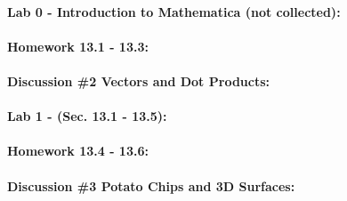 \documentclass[9pt]{amsart}
\begin{document}
        \paragraph{Lab 0 - Introduction to Mathematica (not collected):}\leavevmode\par\medskip
            
            \leavevmode\par\medskip
            
        \paragraph{Homework 13.1 - 13.3:}\leavevmode\par\medskip
            
            \leavevmode\par\medskip
            
        \paragraph{Discussion \#2 Vectors and Dot Products:}\leavevmode\par\medskip
            
            \leavevmode\par\medskip
        \newpage    
        \paragraph{Lab 1 - (Sec. 13.1 - 13.5):}\leavevmode\par\medskip
            
            \leavevmode\par\medskip
            
        \paragraph{Homework 13.4 - 13.6:}\leavevmode\par\medskip
            
            \leavevmode\par\medskip
            
        \paragraph{Discussion \#3 Potato Chips and 3D Surfaces:}\leavevmode\par\medskip
            
            \leavevmode\par\medskip
\end{document}
